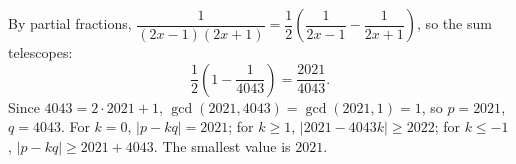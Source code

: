 By partial fractions, $\dfrac{1}{(2x-1)(2x+1)}=\dfrac12\left(\dfrac{1}{2x-1}-\dfrac{1}{2x+1}\right)$, so the sum telescopes:
\[\dfrac12\left(1-\dfrac{1}{4043}\right)=\dfrac{2021}{4043}.\]
Since $4043=2\cdot2021+1$, $\gcd(2021,4043)=\gcd(2021,1)=1$, so $p=2021$, $q=4043$. For $k=0$, $|p-kq|=2021$; for $k\ge1$, $|2021-4043k|\ge2022$; for $k\le-1$, $|p-kq|\ge2021+4043$. The smallest value is $\boxed{2021}$.
